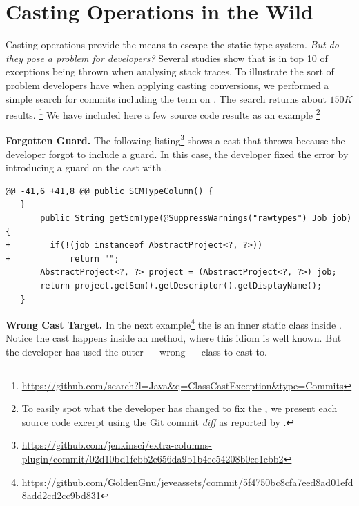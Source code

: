 
\newcommand{\ctag}[1]{\textsl{#1}}
\newcommand{\cpattern}[1]{\textsc{#1}}

\chapter{Casting Operations in the Wild}
\label{cha:casts}


Casting operations provide the means to escape the static type system.
\emph{But do they pose a problem for developers?}
Several studies
\citep{kechagiaUndocumentedUncheckedExceptions2014,coelhoUnveilingExceptionHandling2015,zhitnitskyTop10Exception2016}
show that  is in top 10 of exceptions being
thrown when analysing stack traces.
%
To illustrate the sort of problem developers have when applying casting
conversions, we performed a simple search for
commits
including the term  on \github.
The search returns about
$150K$
results.%
\footnote{\url{https://github.com/search?l=Java&q=ClassCastException&type=Commits}}
We have included here a few source code results as an example%
\footnote{To easily spot what the developer has changed to fix
the , we present each source code excerpt
using the Git commit \emph{diff} as reported by \github{}.}

\textbf{Forgotten Guard.}
The following listing\footnote{\url{https://github.com/jenkinsci/extra-columns-plugin/commit/02d10bd1fcbb2e656da9b1b4ec54208b0cc1cbb2}}
shows a cast that throws  because the developer forgot to include a guard.
In this case, the developer fixed the error by introducing a guard on the cast with .

\begin{lstlisting}[style=java]
@@ -41,6 +41,8 @@ public SCMTypeColumn() {
   }
       public String getScmType(@SuppressWarnings("rawtypes") Job job) {
+        if(!(job instanceof AbstractProject<?, ?>))
+            return "";
       AbstractProject<?, ?> project = (AbstractProject<?, ?>) job;
       return project.getScm().getDescriptor().getDisplayName();
   }
\end{lstlisting}

\textbf{Wrong Cast Target.}
In the next example\footnote{\url{https://github.com/GoldenGnu/jeveassets/commit/5f4750bc8cfa7eed8ad01efd8add2cd2cc9bd831}}
the  is an inner static class inside .
Notice the cast happens inside an  method, where this idiom is well known.
But the developer has used the outer --- wrong --- class to cast to.

